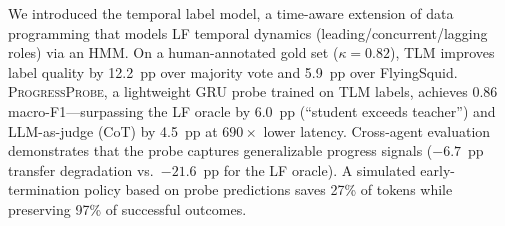 \documentclass[11pt,a4paper]{article}
\newcommand{\ours}{\textsc{ProgressProbe}}
\newcommand{\tlm}{\textsc{TLM}}
\begin{document}
We introduced the temporal label model, a time-aware extension of data programming that models LF temporal dynamics (leading/concurrent/lagging roles) via an HMM. On a human-annotated gold set ($\kappa{=}0.82$), \tlm{} improves label quality by 12.2~pp over majority vote and 5.9~pp over FlyingSquid. \ours{}, a lightweight GRU probe trained on \tlm{} labels, achieves 0.86 macro-F1---surpassing the LF oracle by 6.0~pp (``student exceeds teacher'') and LLM-as-judge (CoT) by 4.5~pp at $690\times$ lower latency. Cross-agent evaluation demonstrates that the probe captures generalizable progress signals ($-6.7$~pp transfer degradation vs.\ $-21.6$~pp for the LF oracle). A simulated early-termination policy based on probe predictions saves 27\% of tokens while preserving 97\% of successful outcomes.

%
\end{document}

